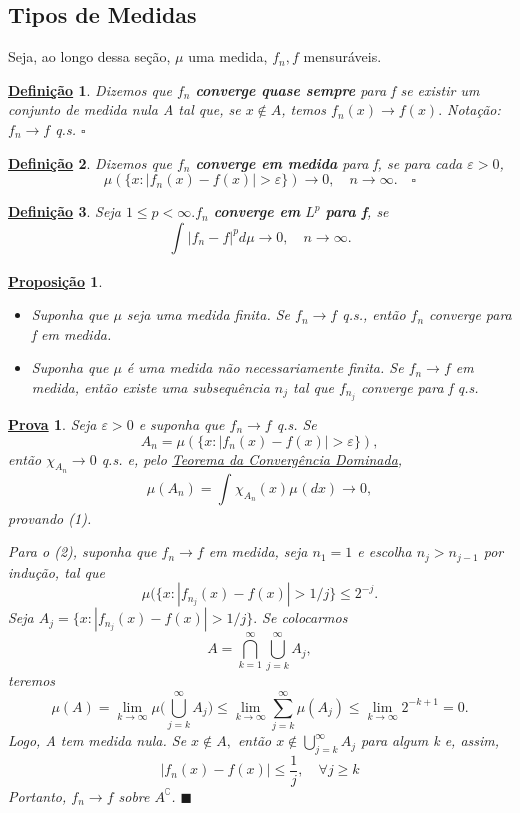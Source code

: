 \documentclass{article}
\newtheorem*{def*}{\underline{Defini\c c\~ao}}
\newtheorem*{prop*}{\underline{Proposi\c c\~ao}}
\newtheorem*{proof*}{\underline{Prova}}
\renewcommand\qedsymbol{$\blacksquare$}
\begin{document}
\subsection{Tipos de Medidas}
  Seja, ao longo dessa seção, \(\mu \) uma medida, \(f_{n}, f\) mensuráveis. 
 \begin{def*}
   Dizemos que \(f_{n}\) \textbf{converge quase sempre} para f se existir um conjunto de medida nula A tal que, se \(x\not\in A\), temos \(f_{n}(x)\to f(x).\) Notação: \(f_{n}\to f\) q.s. \(\square\)
 \end{def*}
 \begin{def*}
   Dizemos que \(f_{n}\) \textbf{converge em medida} para f, se para cada \(\varepsilon  > 0\),
     \[
       \mu (\{x: |f_{n}(x) - f(x)| > \varepsilon \})\to 0,\quad n\to \infty.\quad \square 
     \]
 \end{def*}
 \begin{def*}
   Seja \(1\leq p < \infty. f_{n}\)\textbf{ converge em }\(L^{p}\)\textbf{ para f}, se 
     \[
       \int_{}|f_{n} - f|^{p} d\mu\to 0,\quad n\to \infty.
     \]
 \end{def*}
\begin{prop*}
  \begin{itemize}
    \item[i)]Suponha que \(\mu \) seja uma medida finita. Se \(f_{n}\to f\) q.s., então \(f_{n}\) converge para f em medida.
    \item[ii)] Suponha que \(\mu \) é uma medida não necessariamente finita. Se \(f_{n}\to f\) em medida, então existe uma subsequência \(n_{j}\) tal que \(f_{n_{j}}\) converge para f q.s.
  \end{itemize}
\end{prop*}
\begin{proof*}
  Seja \(\varepsilon > 0\) e suponha que \(f_{n}\to f\) q.s. Se 
    \[
      A_{n} = \mu (\{x: |f_{n}(x) - f(x)| > \varepsilon \}),
    \]
  então \(\chi_{A_{n}}\to 0\) q.s. e, pelo \hyperlink{dominated_convergence}{Teorema da Convergência Dominada}, 
    \[
      \mu (A_{n}) = \int_{}\chi_{A_{n}}(x) \mu_{}(dx)\to 0,
    \]
  provando (1).

  Para o (2), suponha que \(f_{n}\to f\) em medida, seja \(n_1 = 1\) e escolha \(n_{j} > n_{j-1}\) por indução, tal que 
    \[
      \mu (\{x: |f_{n_{j}}(x) - f(x)| > 1/j\} \leq 2^{-j}.
    \]
  Seja \(A_{j} = \{x: |f_{n_{j}}(x) - f(x)| > 1/j\}.\) Se colocarmos 
    \[
      A = \bigcap_{k=1}^{\infty}\bigcup_{j=k}^{\infty}A_{j},
    \]
  teremos 
    \[
      \mu (A) = \lim_{k\to \infty}\mu \biggl(\bigcup_{j=k}^{\infty}A_{j}\biggr) \leq \lim_{k\to \infty}\sum\limits_{j=k}^{\infty}\mu (A_{j}) \leq \lim_{k\to \infty}2^{-k+1} = 0.
    \]
  Logo, A tem medida nula. Se \(x\not\in A,\) então \(x\not\in \bigcup_{j=k}^{\infty}A_{j}\) para algum k e, assim, 
    \[
      |f_{n}(x)-f(x)|\leq \frac{1}{j},\quad \forall j\geq k
    \]
  Portanto, \(f_{n}\to f\) sobre \(A ^{\complement}\). \qedsymbol
\end{proof*}
\end{document}

